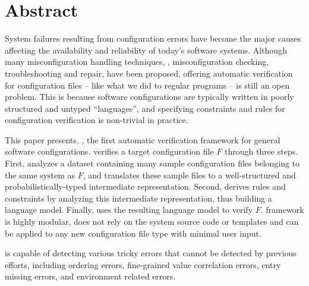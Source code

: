 
\section*{Abstract}

System failures resulting from configuration errors 
have become the major causes affecting the availability and
reliability of today's software systems.
Although many misconfiguration handling techniques,
\eg, misconfiguration checking, troubleshooting and repair, 
have been proposed, 
offering automatic verification for configuration files -- like
what we did to regular programs -- is still an open problem.
This is because software configurations are typically written in
poorly structured and untyped ``languages'', and 
specifying constraints and rules for configuration 
verification is non-trivial in practice.

This paper presents, \app, the first automatic verification framework for
general software configurations.
\app verifies a target configuration file $F$ through three steps.
First, \app analyzes a dataset containing many sample configuration 
files belonging to the same system as $F$,
and translates these sample files to a
well-structured and probabilistically-typed 
intermediate representation.
Second, \app derives rules and constraints by analyzing
this intermediate representation, thus building a
language model.
Finally, \app uses the resulting language model to verify $F$.
\app framework is highly modular, 
does not rely on the system source code or templates and
can be applied to any new configuration file type with minimal user input. 

\app is capable of detecting various tricky errors that cannot
be detected by previous efforts,
including ordering errors, fine-grained value correlation errors, 
entry missing errors, and environment related errors. 
